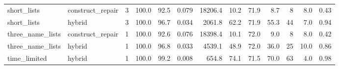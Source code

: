 \begin{table}[tb]
\begin{tabular}{@{}llrrrrrrrrrrr@{}}
short\_lists & construct\_repair & 3 & 100.0 & 92.5 & 0.079 & 18206.4 & 10.2 & 71.9 & 8.7 & 8 & 8.0 & 0.43 \\
short\_lists & hybrid & 3 & 100.0 & 96.7 & 0.034 & 2061.8 & 62.2 & 71.9 & 55.3 & 44 & 7.0 & 0.94 \\
three\_name\_lists & construct\_repair & 1 & 100.0 & 92.6 & 0.076 & 18398.4 & 10.1 & 72.0 & 9.0 & 8 & 8.0 & 0.42 \\
three\_name\_lists & hybrid & 1 & 100.0 & 96.8 & 0.033 & 4539.1 & 48.9 & 72.0 & 36.0 & 25 & 10.0 & 0.86 \\
time\_limited & hybrid & 1 & 100.0 & 99.2 & 0.008 & 654.8 & 74.1 & 71.5 & 70.0 & 63 & 4.0 & 0.98 \\
\bottomrule\end{tabular}\end{table}
